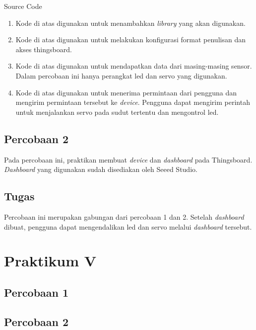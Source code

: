 \documentclass{class}
\begin{document}
  Source Code
    \begin{enumerate}
      \item 
      Kode di atas digunakan untuk menambahkan \emph{library} yang akan digunakan. \\
      \item 
      Kode di atas digunakan untuk melakukan konfigurasi format penulisan dan akses thingsboard. \\
      \item 
      Kode di atas digunakan untuk mendapatkan data dari masing-masing sensor.
      Dalam percobaan ini hanya perangkat led dan servo yang digunakan. \\
      \item 
      Kode di atas digunakan untuk menerima permintaan dari pengguna dan mengirim permintaan tersebut ke \emph{device}.
      Pengguna dapat mengirim perintah untuk menjalankan servo pada sudut tertentu dan mengontrol led. \\
    \end{enumerate}
  \subsection{Percobaan 2}
  Pada percobaan ini, praktikan membuat \emph{device} dan \emph{dashboard} pada Thingsboard.
  \emph{Dashboard} yang digunakan sudah disediakan oleh Seeed Studio.
  \subsection{Tugas}
  Percobaan ini merupakan gabungan dari percobaan 1 dan 2.
  Setelah \emph{dashboard} dibuat, pengguna dapat mengendalikan led dan servo melalui \emph{dashboard} tersebut.

  \section{Praktikum V}
  \subsection{Percobaan 1}
  \subsection{Percobaan 2}
\end{document}
